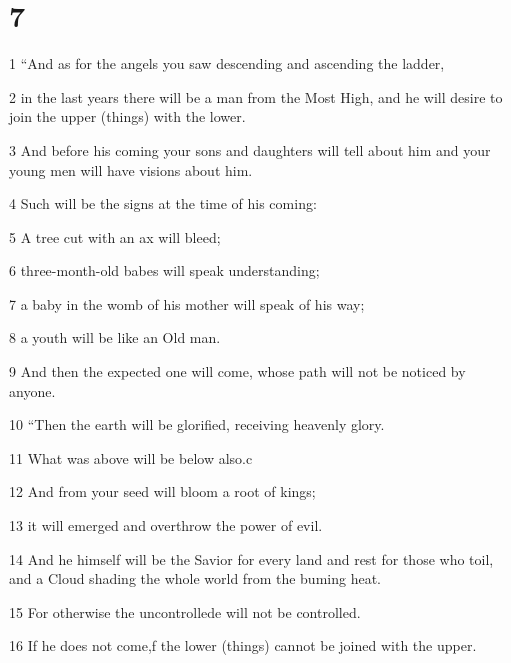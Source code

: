 \chapter{7}

\par 1 “And as for the angels you saw descending and ascending the ladder,

\par 2 in the last years there will be a man from the Most High, and he will desire to join the upper (things) with the lower. 

\par 3 And before his coming your sons and daughters will tell about him and your young men will have visions about him. 

\par 4 Such will be the signs at the time of his coming: 

\par 5 A tree cut with an ax will bleed; 

\par 6 three-month-old babes will speak understanding; 

\par 7 a baby in the womb of his mother will speak of his way; 

\par 8 a youth will be like an Old man. 

\par 9 And then the expected one will come, whose path will not be noticed by anyone.

\par 10 “Then the earth will be glorified, receiving heavenly glory. 

\par 11 What was above will be below also.c 

\par 12 And from your seed will bloom a root of kings; 

\par 13 it will emerged and overthrow the power of evil. 

\par 14 And he himself will be the Savior for every land and rest for those who toil, and a Cloud shading the whole world from the buming heat. 

\par 15 For otherwise the uncontrollede will not be controlled. 

\par 16 If he does not come,f the lower (things) cannot be joined with the upper. 

